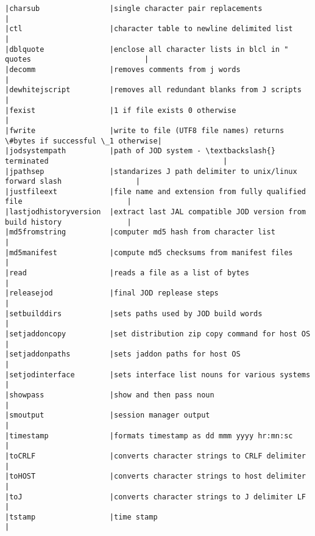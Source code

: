 \documentclass[11pt,letter,landscape]{article}
\begin{document}
\begin{Verbatim}[commandchars=\\\{\}]
|charsub                |single character pair replacements                                       |
|ctl                    |character table to newline delimited list                                |
|dblquote               |enclose all character lists in blcl in " quotes                          |
|decomm                 |removes comments from j words                                            |
|dewhitejscript         |removes all redundant blanks from J scripts                              |
|fexist                 |1 if file exists 0 otherwise                                             |
|fwrite                 |write to file (UTF8 file names) returns \#bytes if successful \_1 otherwise|
|jodsystempath          |path of JOD system - \textbackslash{} terminated                                        |
|jpathsep               |standarizes J path delimiter to unix/linux forward slash                 |
|justfileext            |file name and extension from fully qualified file                        |
|lastjodhistoryversion  |extract last JAL compatible JOD version from build history               |
|md5fromstring          |computer md5 hash from character list                                    |
|md5manifest            |compute md5 checksums from manifest files                                |
|read                   |reads a file as a list of bytes                                          |
|releasejod             |final JOD replease steps                                                 |
|setbuilddirs           |sets paths used by JOD build words                                       |
|setjaddoncopy          |set distribution zip copy command for host OS                            |
|setjaddonpaths         |sets jaddon paths for host OS                                            |
|setjodinterface        |sets interface list nouns for various systems                            |
|showpass               |show and then pass noun                                                  |
|smoutput               |session manager output                                                   |
|timestamp              |formats timestamp as dd mmm yyyy hr:mn:sc                                |
|toCRLF                 |converts character strings to CRLF delimiter                             |
|toHOST                 |converts character strings to host delimiter                             |
|toJ                    |converts character strings to J delimiter LF                             |
|tstamp                 |time stamp                                                               |

\end{Verbatim}
\end{document}

